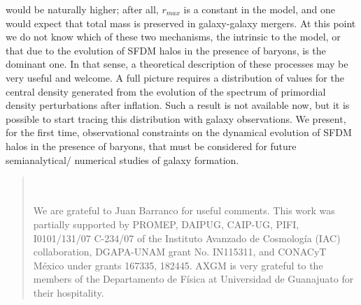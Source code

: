 \documentclass[10pt,letterpaper,twocolumn]{article}
\begin{document}
would be naturally higher; after all, $r_{max}$ is a constant
in the model, and one would expect that total mass is
preserved in galaxy-galaxy mergers. At this point we do
not know which of these two mechanisms, the intrinsic to
the model, or that due to the evolution of SFDM halos
in the presence of baryons, is the dominant one. In that
sense, a theoretical description of these processes may be
very useful and welcome.
A full picture requires a distribution of values for the
central density generated from the evolution of the spectrum
of primordial density perturbations after inflation.
Such a result is not available now, but it is possible to
start tracing this distribution with galaxy observations.
We present, for the first time, observational constraints
on the dynamical evolution of SFDM halos in the presence
of baryons, that must be considered for future semianalytical/
numerical studies of galaxy formation.\\ 

\renewcommand{\abstractname}{\center\small {ACKNOWLEDGMENTS}}
\begin{abstract}
\\\\We are grateful to Juan Barranco for useful comments.
This work was partially supported by PROMEP, DAIPUG,
CAIP-UG, PIFI, I0101/131/07 C-234/07 of the Instituto
Avanzado de Cosmología (IAC) collaboration,
DGAPA-UNAM grant No. IN115311, and CONACyT
México under grants 167335, 182445. AXGM is very
grateful to the members of the Departamento de Física
at Universidad de Guanajuato for their hospitality.
\end{abstract}

\newpage


\end{document}
